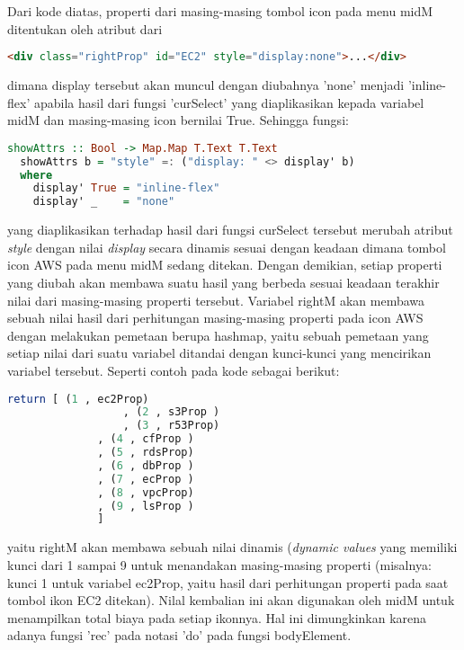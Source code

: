 \documentclass[pi.tex]{subfile}
\begin{document}
   Dari kode diatas, properti dari masing-masing tombol icon pada menu midM ditentukan oleh atribut dari
  \begin{lstlisting}[language=HTML]
  <div class="rightProp" id="EC2" style="display:none">...</div>
  \end{lstlisting}
dimana display tersebut akan muncul dengan diubahnya 'none' menjadi 'inline-flex' apabila hasil dari fungsi 'curSelect' yang diaplikasikan kepada variabel midM dan masing-masing icon bernilai True. Sehingga fungsi:
  \begin{lstlisting}[language=Haskell]
  showAttrs :: Bool -> Map.Map T.Text T.Text
  showAttrs b = "style" =: ("display: " <> display' b)
  where
    display' True = "inline-flex"
    display' _    = "none"
  \end{lstlisting}
  yang diaplikasikan terhadap hasil dari fungsi curSelect tersebut merubah atribut \emph{style} dengan nilai \emph{display} secara dinamis sesuai dengan keadaan dimana tombol icon AWS pada menu midM sedang ditekan. Dengan demikian, setiap properti yang diubah akan membawa suatu hasil yang berbeda sesuai keadaan terakhir nilai dari masing-masing properti tersebut. Variabel rightM akan membawa sebuah nilai hasil dari perhitungan masing-masing properti pada icon AWS dengan melakukan pemetaan berupa hashmap, yaitu sebuah pemetaan yang setiap nilai dari suatu variabel ditandai dengan kunci-kunci yang mencirikan variabel tersebut. Seperti contoh pada kode sebagai berikut:
    \begin{lstlisting}[language=Haskell]
               return [ (1 , ec2Prop)
	              , (2 , s3Prop )
	              , (3 , r53Prop)
		      , (4 , cfProp )
		      , (5 , rdsProp)
		      , (6 , dbProp )
		      , (7 , ecProp )
		      , (8 , vpcProp)
		      , (9 , lsProp )
		      ]
    \end{lstlisting}
    yaitu rightM akan membawa sebuah nilai dinamis (\emph{dynamic values} yang memiliki kunci dari 1 sampai 9 untuk menandakan masing-masing properti (misalnya: kunci 1 untuk variabel ec2Prop, yaitu hasil dari perhitungan properti pada saat tombol ikon EC2 ditekan). Nilal kembalian ini akan digunakan oleh midM untuk menampilkan total biaya pada setiap ikonnya. Hal ini dimungkinkan karena adanya fungsi 'rec' pada notasi 'do' pada fungsi bodyElement.
\end{document}
